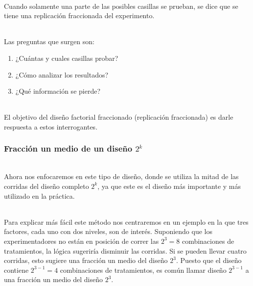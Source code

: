 \documentclass[12pt]{beamer}
\begin{document}
\begin{frame}
~\\Cuando solamente una parte de las posibles casillas se prueban, se dice que se tiene una replicación fraccionada del experimento.

~\\Las preguntas que surgen son:

\begin{enumerate}[1.]
    \item ¿Cuántas y cuales casillas probar?
    \item ¿Cómo analizar los resultados?
    \item ¿Qué información se pierde?
\end{enumerate}

~\\El objetivo del diseño factorial fraccionado (replicación fraccionada) es darle respuesta a estos interrogantes.

\end{frame}

\begin{frame}
\frametitle{Fracción un medio de un diseño $ 2^{k} $}
~\\Ahora nos enfocaremos en este tipo de diseño, donde se utiliza la mitad de las corridas del diseño completo $2^k$, ya que este es el diseño más importante y más utilizado en la práctica.

~\\Para explicar más fácil este método nos centraremos en un ejemplo en la que tres factores, cada uno con dos niveles, son de interés. Suponiendo que los experimentadores no están en posición de correr las $2^3=8$ combinaciones de tratamientos, la lógica sugeriría disminuir las corridas. Si se pueden llevar cuatro corridas, esto sugiere una fracción un medio del diseño $2^3$. Puesto que el diseño contiene $2^{3-1}=4$ combinaciones de tratamientos, es común llamar diseño $2^{3-1}$ a una fracción un medio del diseño $2^3$.
\end{frame}
\end{document}
